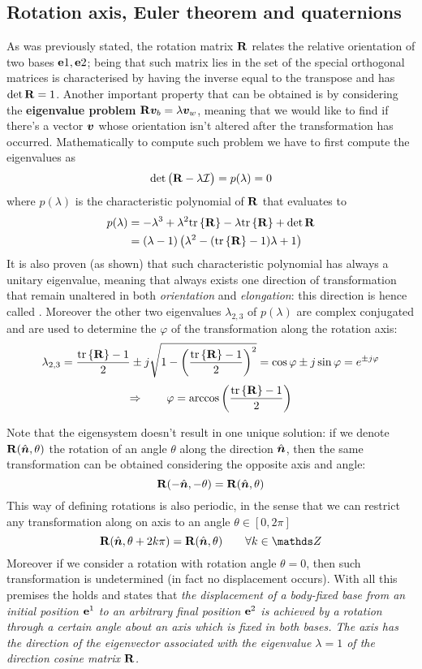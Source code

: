 	\subsection{Rotation axis, Euler theorem and quaternions}
		As was previously stated, the rotation matrix $\mathbf{R}$ relates the relative orientation of two bases $\mathbf{e} 1,\mathbf{e} 2$; being that such matrix lies in the set of the special orthogonal matrices is characterised by having the inverse equal to the transpose and has $\det \mathbf{R}=1$. Another important property that can be obtained is by considering the \textbf{eigenvalue problem} $\mathbf{R} \boldsymbol{v}_b = \lambda \boldsymbol{v}_w$, meaning that we would like to find if there's a vector $\boldsymbol{v}$ whose orientation isn't altered after the transformation has occurred. Mathematically to compute such problem we have to first compute the eigenvalues as
		\[ \det\big(\mathbf{R} - \lambda \mathcal I\big) = p(\lambda) = 0 \]
		where $p(\lambda)$ is the characteristic polynomial of $\mathbf{R}$ that evaluates to
		\begin{align*}
			p(\lambda) & = - \lambda^3 + \lambda^2 \textrm{tr}\left\{\mathbf{R}\right\} - \lambda \textrm{tr}\left\{\mathbf{R}\right\} + \det \mathbf{R} \\
			& = (\lambda - 1) \left( \lambda^2 - (\textrm{tr}\left\{\mathbf{R}\right\} - 1) \lambda + 1 \right)  
		\end{align*}
		It is also proven (as shown) that such characteristic polynomial has always a unitary eigenvalue, meaning that always exists one direction of transformation that remain unaltered in both \textit{orientation} and \textit{elongation}: this direction is hence called . Moreover the other two eigenvalues $\lambda_{2,3}$ of $p(\lambda)$ are complex conjugated and are used to determine the  $\varphi$ of the transformation along the rotation axis:
		\[ \lambda_{2,3} = \frac{\textrm{tr}\left\{\mathbf{R}\right\} -1 }{2} \pm j \sqrt{1- \left( \frac{\textrm{tr}\left\{\mathbf{R}\right\} - 1}{2} \right)^2} = \cos\varphi \pm j \sin\varphi = e^{\pm j\varphi} \]
		\begin{equation}
			\Rightarrow \qquad  \varphi = \arccos\left( \frac{\textrm{tr}\left\{\mathbf{R}\right\} - 1}{2} \right)
		\end{equation}
		
		Note that the eigensystem doesn't result in one unique solution: if we denote $\mathbf{R}(\hat{\boldsymbol{n}},\theta)$ the rotation of an angle $\theta$ along the direction $\hat{\boldsymbol{n}}$, then the same transformation can be obtained considering the opposite axis and angle:
		\[ \mathbf{R}(-\hat{\boldsymbol{n}} ,-\theta) = \mathbf{R}(\hat{\boldsymbol{n}},\theta) \]
		This way of defining rotations is also periodic, in the sense that we can restrict any transformation along on axis to an angle $\theta\in[0,2\pi]$
		\[ \R(\vers n,\theta + 2k\pi) = \R(\vers n,\theta) \qquad \forall k \in \mathds Z \]
		Moreover if we consider a rotation with rotation angle $\theta=0$, then such transformation is undetermined (in fact no displacement occurs). With all this premises the  holds and states that {\itshape the displacement of a body-fixed base from an initial position $\mathbf{e}^1$ to an arbitrary final position $\mathbf{e}^2$ is achieved by a rotation through a certain angle about an axis which is fixed in both bases. The axis has the direction of the eigenvector associated with the eigenvalue $\lambda= 1$ of the direction cosine matrix $\mathbf{R}$. }
		
